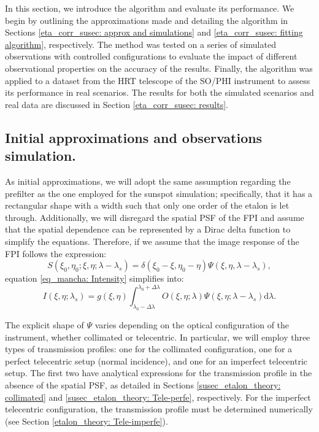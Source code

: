 In this section, we introduce the algorithm and evaluate its performance. We begin by outlining the approximations made and detailing the algorithm in Sections \ref{eta_corr_susec: approx and simulations} and \ref{eta_corr_susec: fitting algorithm}, respectively. The method was tested on a series of simulated observations with controlled configurations to evaluate the impact of different observational properties on the accuracy of the results. Finally, the algorithm was applied to a dataset from the HRT telescope of the SO/PHI instrument to assess its performance in real scenarios. The results for both the simulated scenarios and real data are discussed in Section \ref{eta_corr_susec: results}.

\subsection{\label{eta_corr_susec: approx and simulations}Initial approximations and observations simulation.}

As initial approximations, we will adopt the same assumption regarding the prefilter as the one employed for the sunspot simulation; specifically, that it has a rectangular shape with a width such that only one order of the etalon is let through. Additionally, we will disregard the spatial PSF of the FPI and assume that the spatial dependence can be represented by a Dirac delta function to simplify the equations. Therefore, if we assume that the image response of the FPI follows the expression:
\begin{equation}
S\left(\xi_0, \eta_0; \xi , \eta; \lambda-\lambda_{s}\right)=\delta(\xi_0-\xi,\eta_0-\eta)\Psi(\xi,\eta,\lambda-\lambda_s),
\end{equation}
equation \eqref{eq_mancha: Intensity} simplifies into:
\begin{equation}
    I\left(\xi, \eta ; \lambda_{s}\right)=g(\xi, \eta)\int_{\lambda _ 0 - \Delta \lambda}^{\lambda _ 0 + \Delta \lambda} O\left(\xi, \eta ; \lambda\right) \Psi\left(\xi, \eta ; \lambda-\lambda_{s}\right)  \mathrm{d} \lambda.
    \label{eq_eta_corr: intensity}
\end{equation}

The explicit shape of $\Psi$ varies depending on the optical configuration of the instrument, whether collimated or telecentric. In particular, we will employ three types of transmission profiles: one for the collimated configuration, one for a perfect telecentric setup (normal incidence), and one for an imperfect telecentric setup. The first two have analytical expressions for the transmission profile in the absence of the spatial PSF, as detailed in Sections \ref{susec_etalon_theory: collimated} and \ref{susec_etalon_theory: Tele-perfe}, respectively. For the imperfect telecentric configuration, the transmission profile must be determined numerically (see Section \ref{etalon_theory: Tele-imperfe}).
  
